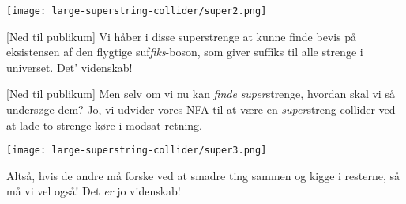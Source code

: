 \documentclass[a4paper,11pt]{article}
\begin{document}
\begin{sketch}
\texttt{[image: large-superstring-collider/super2.png]}

[Ned til publikum] Vi håber i disse superstrenge at kunne
finde bevis på eksistensen af den flygtige
suf\textit{fiks}-boson,  som giver suffiks til alle strenge
i universet.  Det' videnskab!

[Ned til publikum] Men selv om vi nu kan \textit{finde}
\textit{super}strenge, hvordan skal vi så undersøge dem? 
Jo, vi udvider vores NFA til at være en \textit{super}streng-collider
ved at lade to strenge køre i modsat retning.

\texttt{[image: large-superstring-collider/super3.png]}

 Altså, hvis de andre må forske ved at smadre ting sammen og
kigge i resterne, så må vi vel også!  Det \textit{er} jo videnskab!


\end{sketch}
\end{document}
